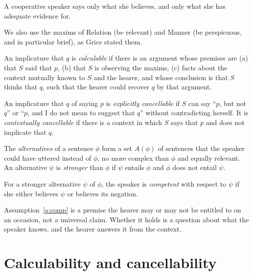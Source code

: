 \documentclass{situationist-preprint}
\begin{document}
\begin{principle}[Quality]\label{p:qual}
A cooperative speaker says only what she believes, and only what she has adequate evidence for.
\end{principle}

We also use the maxims of Relation (be relevant) and Manner (be perspicuous, and in particular brief), as Grice stated them.

\begin{definition}[Calculability]\label{d:calc}
An implicature that $q$ is \emph{calculable} if there is an argument whose premises are (a) that $S$ said that $p$, (b) that $S$ is observing the maxims, (c) facts about the context mutually known to $S$ and the hearer, and whose conclusion is that $S$ thinks that $q$, such that the hearer could recover $q$ by that argument.
\end{definition}

\begin{definition}[Cancellability]\label{d:cancel}
An implicature that $q$ of saying $p$ is \emph{explicitly cancellable} if $S$ can say \enquote{$p$, but not $q$} or \enquote{$p$, and I do not mean to suggest that $q$} without contradicting herself. It is \emph{contextually cancellable} if there is a context in which $S$ says that $p$ and does not implicate that $q$.
\end{definition}

\begin{definition}[Alternatives]\label{d:alt}
The \emph{alternatives} of a sentence $\phi$ form a set $A(\phi)$ of sentences that the speaker could have uttered instead of $\phi$, no more complex than $\phi$ and equally relevant. An alternative $\psi$ is \emph{stronger} than $\phi$ if $\psi$ entails $\phi$ and $\phi$ does not entail $\psi$.
\end{definition}

\begin{assumption}[Competence]\label{a:comp}
For a stronger alternative $\psi$ of $\phi$, the speaker is \emph{competent} with respect to $\psi$ if she either believes $\psi$ or believes its negation.
\end{assumption}

Assumption~\ref{a:comp} is a premise the hearer may or may not be entitled to on an occasion, not a universal claim. Whether it holds is a question about what the speaker knows, and the hearer answers it from the context.

\section{Calculability and cancellability}
\end{document}

